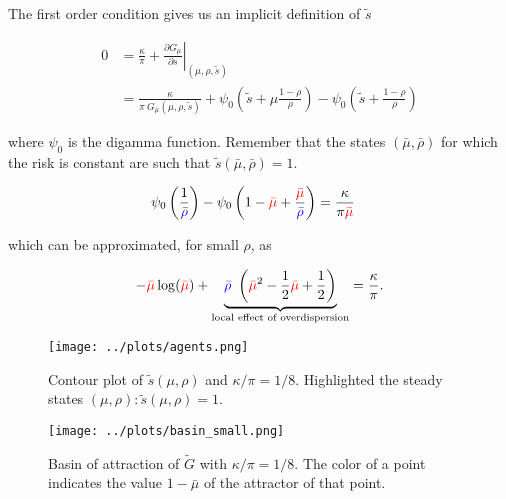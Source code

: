 \documentclass[draft, american, abstract=on]{scrartcl}
\theoremstyle{plain}
\begin{document}
The first order condition gives us an implicit definition of $\tilde{s}$ 

\begin{equation}
  \begin{split}
    0 &= \frac{\kappa}{\pi} + \left. \frac{\partial G_\mu}{\partial s} \right\vert_{(\mu, \rho, \tilde{s})}  \\
    &= \frac{\kappa}{\pi \ G_\mu(\mu, \rho, \tilde{s})} + \psi_0\left(\tilde{s} + \mu \frac{1 - \rho}{\rho} \right) - \psi_0\left(\tilde{s} + \frac{1 - \rho}{\rho} \right)  
  \end{split}
\end{equation}

where $\psi_0$ is the digamma function. Remember that the states $(\bar{\mu}, \bar{\rho})$ for which the risk is constant are such that $\tilde{s}(\bar{\mu}, \bar{\rho})= 1$.

\begin{equation}
  \begin{split}
    \psi_0\left(\frac{1}{\textcolor{blue}{\bar{\rho}}} \right) - \psi_0\left(1 - \textcolor{red}{\bar{\mu}} + \frac{ \textcolor{red}{\bar{\mu}} }{\textcolor{blue}{\bar{\rho}}} \right) &= \frac{\kappa}{\pi \textcolor{red}{\bar{\mu}}}
  \end{split}
\end{equation}

which can be approximated, for small $\rho$, as

\begin{equation}
   - \textcolor{red}{\bar{\mu}}\log(\textcolor{red}{\bar{\mu}}) + \underbrace{\textcolor{blue}{\bar{\rho}} \ \left(\textcolor{red}{\bar{\mu}}^2 - \frac{1}{2}\textcolor{red}{\bar{\mu}} + \frac{1}{2}\right)}_{\text{local effect of overdispersion}} = \frac{\kappa}{\pi}.
\end{equation}

\begin{figure}[H]
  \centering
  \texttt{[image: ../plots/agents.png]}
  \caption{Contour plot of $\tilde{s}(\mu, \rho)$ and $\kappa / \pi = 1 / 8$. Highlighted the steady states $(\mu, \rho): \tilde{s}(\mu, \rho) = 1$.}
  \label{fig:agents-optimum}
\end{figure}

\begin{figure}[H]
  \centering
  \texttt{[image: ../plots/basin\_small.png]}
  \caption{Basin of attraction of $\tilde{G}$ with $\kappa / \pi = 1 / 8$. The color of a point indicates the value $1 - \bar{\mu}$ of the attractor of that point.}
  \label{fig:basin-plot}
\end{figure}
\end{document}
